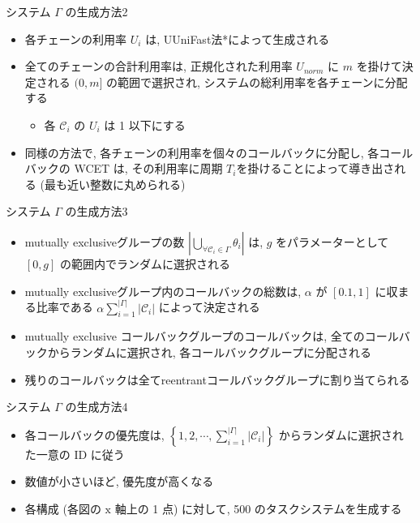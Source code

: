 \begin{frame}{システム $\Gamma$ の生成方法2}
    \begin{itemize}
        \item 各チェーンの利用率 $U_{i}$ は, UUniFast法*によって生成される
        \item 全てのチェーンの合計利用率は, 正規化された利用率 $U_{n o r m}$ に $m$ を掛けて決定される $(0, m]$ の範囲で選択され, システムの総利用率を各チェーンに分配する
              \begin{itemize}
                  \item 各 $\mathcal{C}_{i}$ の $U_{i}$ は 1 以下にする
              \end{itemize}
        \item 同様の方法で, 各チェーンの利用率を個々のコールバックに分配し, 各コールバックの WCET は, その利用率に周期 $T_{i}$を掛けることによって導き出される (最も近い整数に丸められる)
    \end{itemize}
\end{frame}

\begin{frame}{システム $\Gamma$ の生成方法3}
    \begin{itemize}
        \item mutually exclusiveグループの数 $\left|\bigcup_{\forall \mathcal{C}_{i} \in \Gamma} \theta_{i}\right|$ は, $g$ をパラメーターとして $[0, g]$ の範囲内でランダムに選択される
        \item mutually exclusiveグループ内のコールバックの総数は, $\alpha$ が $[0.1,1]$ に収まる比率である $\alpha \sum_{i=1}^{|\Gamma|}\left|\mathcal{C}_{i}\right|$ によって決定される
        \item mutually exclusive コールバックグループのコールバックは, 全てのコールバックからランダムに選択され, 各コールバックグループに分配される
        \item 残りのコールバックは全てreentrantコールバックグループに割り当てられる
    \end{itemize}
\end{frame}

\begin{frame}{システム $\Gamma$ の生成方法4}
    \begin{itemize}
        \item 各コールバックの優先度は, $\left\{1,2, \cdots, \sum_{i=1}^{|\Gamma|}\left|\mathcal{C}_{i}\right|\right\}$ からランダムに選択された一意の ID に従う
        \item 数値が小さいほど, 優先度が高くなる
        \item 各構成 (各図の $\mathrm{x}$ 軸上の 1 点) に対して, 500 のタスクシステムを生成する
    \end{itemize}
\end{frame}

